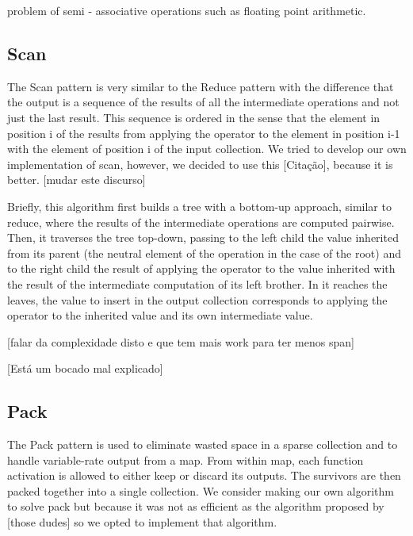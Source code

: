 \documentclass[conference,compsoc]{IEEEtran}
\begin{document}
problem of semi
-
associative operations
such as floating point arithmetic.


\subsection{Scan}

The Scan pattern is very similar to the Reduce pattern with the difference that the output is a sequence of the results of all the intermediate operations and not just the last result. This sequence is ordered in the sense that the element in position i of the results from applying the operator to the element in position i-1 with the element of position i of the input collection.
We tried to develop our own implementation of scan, however, we decided to use this [Citação], because it is better. [mudar este discurso]

Briefly, this algorithm first builds a tree with a bottom-up approach, similar to reduce, where the results of the intermediate operations are computed pairwise. Then, it traverses the tree top-down, passing to the left child the value inherited from its parent (the neutral element of the operation in the case of the root) and to the right child the result of applying the operator to the value inherited with the result of the intermediate computation of its left brother. In it reaches the leaves, the value to insert in the output collection corresponds to applying the operator to the inherited value and its own intermediate value.

[falar da complexidade disto e que tem mais work para ter menos span]

[Está um bocado mal explicado]

\subsection{Pack}
The Pack pattern is used to eliminate wasted space in a
sparse collection and to handle variable-rate output from a
map. From within map, each function activation is allowed to
either keep or discard its outputs. The survivors are then
packed together into a single collection.
We consider making our own algorithm to solve pack but because it was not as efficient
as the algorithm proposed by [those dudes] so we opted to implement that algorithm.
\end{document}
